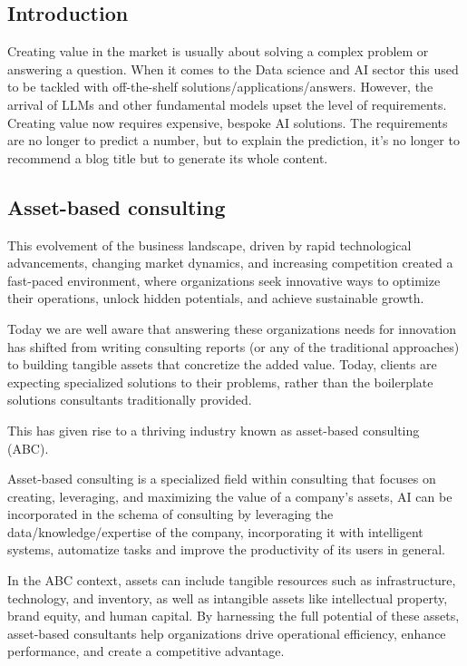 \documentclass[a4paper,12pt]{article}
\begin{document}
\subsection{Introduction}
Creating value in the market is usually about solving a complex problem or answering a question. When it comes to the Data science and AI sector this used to be tackled with off-the-shelf solutions/applications/answers.
However, the arrival of LLMs and other fundamental models upset the level of requirements. Creating value now requires expensive,  bespoke AI solutions. 
The requirements are no longer to predict a number, but to explain the prediction, it's no longer to recommend a blog title but to generate its whole content.   

\subsection{Asset-based consulting}
This evolvement of the business landscape, driven by rapid technological advancements, changing market dynamics, and increasing competition created a fast-paced environment, where organizations seek innovative ways to optimize their operations, unlock hidden potentials, and achieve sustainable growth. 

Today we are well aware that answering these organizations needs for innovation has shifted from writing consulting reports (or any of the traditional approaches) to building tangible assets that concretize the added value. Today, clients are expecting specialized solutions to their problems, rather than the boilerplate solutions consultants traditionally provided.

This has given rise to a thriving industry known as asset-based consulting (ABC).

Asset-based consulting is a specialized field within consulting that focuses on creating, leveraging, and maximizing the value of a company's assets, 
AI can be incorporated in the schema of consulting by leveraging the data/knowledge/expertise of the company, incorporating it with intelligent systems, 
automatize tasks and improve the productivity of its users in general. 

In the ABC context, assets can include tangible resources such as infrastructure, 
technology, and inventory, as well as intangible assets like intellectual property, brand equity, and human capital. 
By harnessing the full potential of these assets, asset-based consultants help organizations drive operational efficiency, 
enhance performance, and create a competitive advantage.
\end{document}
